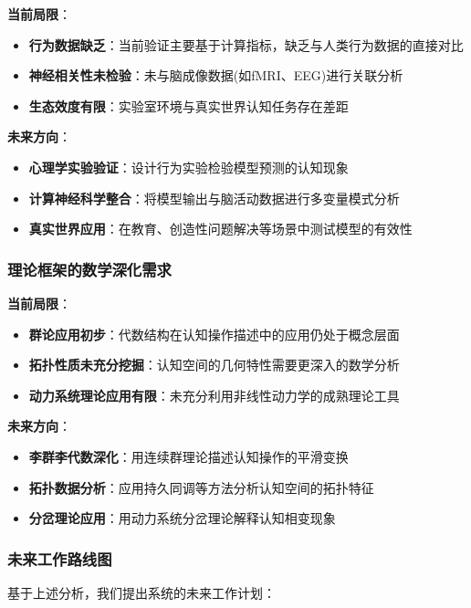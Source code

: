 \documentclass[12pt,a4paper]{article}
\begin{document}
\textbf{当前局限}：
\begin{itemize}
\item \textbf{行为数据缺乏}：当前验证主要基于计算指标，缺乏与人类行为数据的直接对比
\item \textbf{神经相关性未检验}：未与脑成像数据(如fMRI、EEG)进行关联分析
\item \textbf{生态效度有限}：实验室环境与真实世界认知任务存在差距
\end{itemize}

\textbf{未来方向}：
\begin{itemize}
\item \textbf{心理学实验验证}：设计行为实验检验模型预测的认知现象
\item \textbf{计算神经科学整合}：将模型输出与脑活动数据进行多变量模式分析
\item \textbf{真实世界应用}：在教育、创造性问题解决等场景中测试模型的有效性
\end{itemize}

\subsubsection{理论框架的数学深化需求}

\textbf{当前局限}：
\begin{itemize}
\item \textbf{群论应用初步}：代数结构在认知操作描述中的应用仍处于概念层面
\item \textbf{拓扑性质未充分挖掘}：认知空间的几何特性需要更深入的数学分析
\item \textbf{动力系统理论应用有限}：未充分利用非线性动力学的成熟理论工具
\end{itemize}

\textbf{未来方向}：
\begin{itemize}
\item \textbf{李群李代数深化}：用连续群理论描述认知操作的平滑变换
\item \textbf{拓扑数据分析}：应用持久同调等方法分析认知空间的拓扑特征
\item \textbf{分岔理论应用}：用动力系统分岔理论解释认知相变现象
\end{itemize}

\subsubsection{未来工作路线图}

基于上述分析，我们提出系统的未来工作计划：
\end{document}
